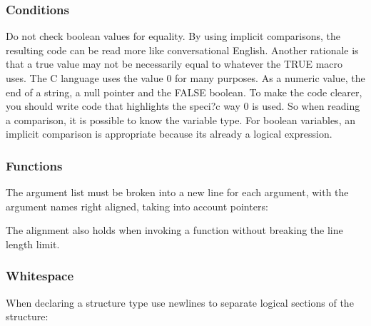 \subsubsection*{Conditions}

Do not check boolean values for equality. By using implicit comparisons, the resulting code can be read more like conversational English. Another rationale is that a \textquotesingle{}true\textquotesingle{} value may not be necessarily equal to whatever the {\ttfamily T\+R\+UE} macro uses. The C language uses the value 0 for many purposes. As a numeric value, the end of a string, a null pointer and the F\+A\+L\+SE boolean. To make the code clearer, you should write code that highlights the speci?c way 0 is used. So when reading a comparison, it is possible to know the variable type. For boolean variables, an implicit comparison is appropriate because it\textquotesingle{}s already a logical expression.

\subsubsection*{Functions}

The argument list must be broken into a new line for each argument, with the argument names right aligned, taking into account pointers\+: 
\begin{DoxyCode}{0}
\DoxyCodeLine{\textcolor{keywordtype}{void}}
\DoxyCodeLine{\{}
\DoxyCodeLine{\}}
\end{DoxyCode}


The alignment also holds when invoking a function without breaking the line length limit.

\subsubsection*{Whitespace}

When declaring a structure type use newlines to separate logical sections of the structure\+: 
\begin{DoxyCode}{0}
\DoxyCodeLine{\{}
\DoxyCodeLine{    }
\DoxyCodeLine{\}}
\end{DoxyCode}


